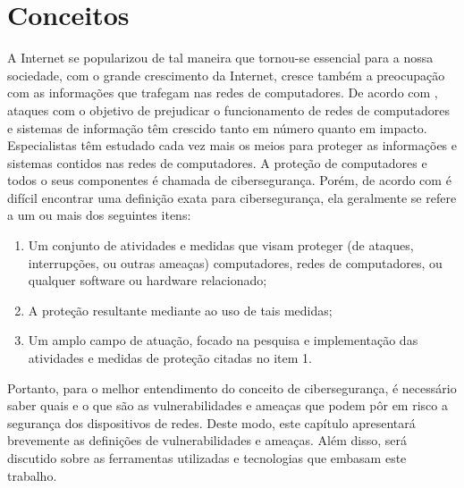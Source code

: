 \chapter{Conceitos}
\label{cap:conceitos}

A Internet se popularizou de tal maneira que tornou-se essencial para a nossa sociedade, com o grande crescimento da Internet, cresce também a preocupação com as informações que trafegam nas redes de computadores. De acordo com , ataques com o objetivo de prejudicar o funcionamento de redes de computadores e sistemas de informação têm  crescido tanto em número quanto em impacto. Especialistas têm estudado cada vez mais os meios para proteger as informações e sistemas contidos nas redes de computadores. A proteção de computadores e todos o seus componentes é chamada de cibersegurança. Porém, de acordo com  é difícil encontrar uma definição exata para cibersegurança, ela geralmente se refere a um ou mais dos seguintes itens:
\begin{enumerate}
    \item Um conjunto de atividades e medidas que visam proteger (de ataques, interrupções, ou outras ameaças) computadores, redes de computadores, ou qualquer software ou hardware relacionado;
    \item A proteção resultante mediante ao uso de tais medidas;
    \item Um amplo campo de atuação, focado na pesquisa e implementação das atividades e medidas de proteção citadas no item 1.
\end{enumerate}

Portanto, para o melhor entendimento do conceito de cibersegurança, é necessário saber quais e o que são as vulnerabilidades e ameaças que podem pôr em risco a segurança dos dispositivos de redes. Deste modo, este capítulo apresentará brevemente as definições de vulnerabilidades e ameaças. Além disso, será discutido sobre as ferramentas utilizadas e tecnologias que embasam este trabalho.





